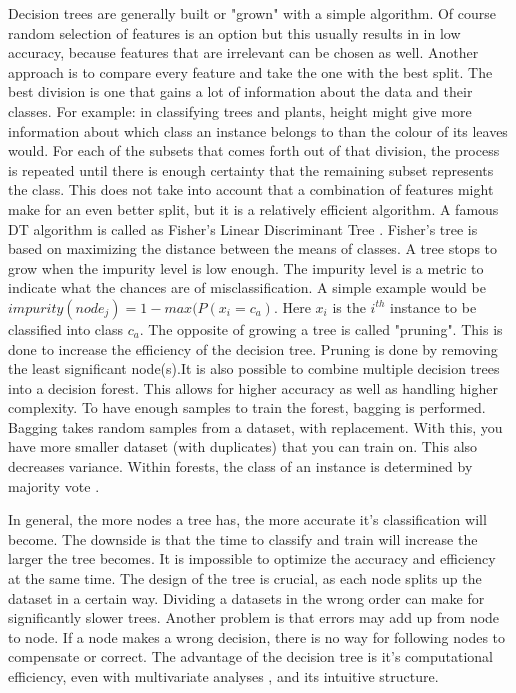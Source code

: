 Decision trees are generally built or "grown" with a simple algorithm. Of course random selection of features is an option but this usually results in in low accuracy, because features that are irrelevant can be chosen as well. Another approach is to compare every feature and take the one with the best split. The best division is one that gains a lot of information about the data and their classes. For example: in classifying trees and plants, height might give more information about which class an instance belongs to than the colour of its leaves would. For each of the subsets that comes forth out of that division, the process is repeated until there is enough certainty that the remaining subset represents the class. This does not take into account that a combination of features might make for an even better split, but it is a relatively efficient algorithm. A famous DT algorithm is called as Fisher's Linear Discriminant Tree \cite{LópezChau20136283}. Fisher's tree is based on maximizing the distance between the means of classes. A tree stops to grow when the impurity level is low enough. The impurity level is a metric to indicate what the chances are of misclassification. A simple example would be $impurity(node_j) = 1 - max(P(x_i = c_a) $. Here $x_i$ is the $i^{th}$ instance to be classified into class $c_a$. The opposite of growing a tree is called "pruning". This is done to increase the efficiency of the decision tree. Pruning is done by removing the least significant node(s).It is also possible to combine multiple decision trees into a decision forest. This allows for higher accuracy as well as handling higher complexity. To have enough samples to train the forest, bagging is performed. Bagging takes random samples from a dataset, with replacement. With this, you have more smaller dataset (with duplicates) that you can train on. This also decreases variance. Within forests, the class of an instance is determined by majority vote \cite{Topouzelis201268}. 

In general, the more nodes a tree has, the more accurate it's classification will become. The downside is that the time to classify and train will increase the larger the tree becomes. It is impossible to optimize the accuracy and efficiency at the same time. The design of the tree is crucial, as each node splits up the dataset in a certain way. Dividing a datasets in the wrong order can make for significantly slower trees. Another problem is that errors may add up from node to node. If a node makes a wrong decision, there is no way for following nodes to compensate or correct. The advantage of the decision tree is it's computational efficiency, even with multivariate analyses \cite{safavian1991survey}, and its intuitive structure.